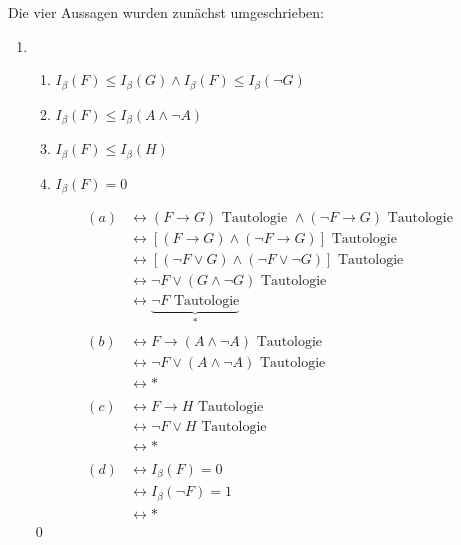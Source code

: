 \documentclass[titlepage]{article}
\newcommand{\1}{\mathbb{1}}
\newcommand{\0}{\mathbb{0}}
\begin{document}
		Die vier Aussagen wurden zunächst umgeschrieben:
		\begin{enumerate}
			\item []
			\begin{enumerate}
				\item $I_{\beta}(F)\le I_{\beta}(G)\land I_{\beta}(F)\le I_{\beta}(\neg G)$
				\item $I_{\beta}(F)\le I_{\beta}(A\land\neg A)$
				\item $I_{\beta}(F)\le I_{\beta}(H)$
				\item $I_{\beta}(F)=0$
			\end{enumerate}
			\begin{align*}
				(a)&\leftrightarrow (F\rightarrow G)\text{ Tautologie }\land(\lnot F\rightarrow G)\text{ Tautologie }\\
				&\leftrightarrow[(F\rightarrow G)\land(\lnot F\rightarrow G)]\text{ Tautologie}\\
				&\leftrightarrow[(\lnot F\lor G)\land(\lnot F\lor\lnot G)]\text{ Tautologie}\\
				&\leftrightarrow\lnot F\lor(G\land\lnot G)\text{ Tautologie}\\
				&\leftrightarrow\underbrace{\lnot F\text{ Tautologie}}_*\\\\
				(b)&\leftrightarrow F\rightarrow(A\land\lnot A)\text{ Tautologie}\\
				&\leftrightarrow\lnot F\lor(A\land\lnot A)\text{ Tautologie}\\
				&\leftrightarrow{*}\\\\
				(c)&\leftrightarrow F\rightarrow H\text{ Tautologie}\\
				&\leftrightarrow\lnot F\lor H\text{ Tautologie}\\
				&\leftrightarrow{*}\\\\
				(d)&\leftrightarrow I_{\beta}(F)=0\\
				&\leftrightarrow I_{\beta}(\lnot F)=1\\
				&\leftrightarrow{*}
			\end{align*}\qed
		\end{enumerate}
\end{document}
